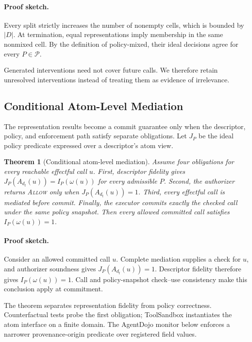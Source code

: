 \documentclass[letterpaper,twocolumn,10pt]{article}
\newcommand{\Allow}{\textnormal{\textsc{Allow}}}
\newtheorem{theorem}{Theorem}
\theoremstyle{definition}
\begin{document}
\paragraph{Proof sketch.}
Every split strictly increases the number of nonempty cells, which is bounded
by $|D|$.  At termination, equal representations imply membership in the same
nonmixed cell.  By the definition of policy-mixed, their ideal decisions agree
for every $P\in\mathcal P$.

Generated interventions need not cover future calls.  We therefore retain
unresolved interventions instead of treating them as evidence of irrelevance.

\subsection{Conditional Atom-Level Mediation}

The representation results become a commit guarantee only when the descriptor,
policy, and enforcement path satisfy separate obligations.  Let $J_P$ be the
ideal policy predicate expressed over a descriptor's atom view.

\begin{theorem}[Conditional atom-level mediation]
\label{thm:conditional-atom-mediation}
Assume four obligations for every reachable effectful call $u$.  First,
descriptor fidelity gives $J_P(A_{d_t}(u))=I_P(\omega(u))$ for every admissible
$P$.  Second, the authorizer returns \Allow{} only when
$J_P(A_{d_t}(u))=1$.  Third, every effectful call is mediated before commit.
Finally, the executor commits exactly the checked call under the same policy
snapshot.  Then every allowed committed call satisfies $I_P(\omega(u))=1$.
\end{theorem}

\paragraph{Proof sketch.}
Consider an allowed committed call $u$.  Complete mediation supplies a check
for $u$, and authorizer soundness gives $J_P(A_{d_t}(u))=1$.  Descriptor
fidelity therefore gives $I_P(\omega(u))=1$.  Call and policy-snapshot
check--use consistency make this conclusion apply at commitment.

The theorem separates representation fidelity from policy correctness.
Counterfactual tests probe the first obligation; ToolSandbox instantiates the
atom interface on a finite domain.  The AgentDojo monitor below enforces a
narrower provenance-origin predicate over registered field values.
\end{document}
